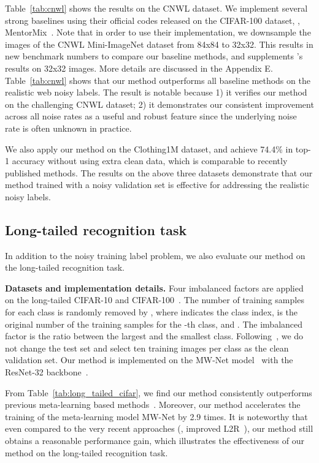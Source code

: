 \documentclass[final]{cvpr}
\begin{document}
Table~\ref{tab:cnwl} shows the results on the CNWL dataset. We implement several strong baselines using their official codes released on the CIFAR-100 dataset, \eg, 
MentorMix~\cite{jiang2020beyond}.
Note that in order to use their implementation, we downsample the images of the CNWL Mini-ImageNet dataset from 84x84 to 32x32. This results in new benchmark numbers to compare our baseline methods, and supplements \cite{jiang2020beyond}'s results on 32x32 images.
More details are discussed in the Appendix E.
Table~\ref{tab:cnwl} shows that our method outperforms all baseline methods on the realistic web noisy labels. The result is notable because 1) it verifies our method on the challenging CNWL dataset; 2) it demonstrates our consistent improvement across all noise rates as a useful and robust feature since the underlying noise rate is often unknown in practice.

We also apply our method on the Clothing1M dataset, and achieve 74.4\% in top-1 accuracy without using extra clean data, which is comparable to recently published methods. 
The results on the above three datasets demonstrate that our method trained with a noisy validation set is effective for addressing the realistic noisy labels.




\subsection{Long-tailed recognition task}

\label{sec:exp_longtail}

In addition to the noisy training label problem, we also evaluate our method on the long-tailed recognition task.

\textbf{Datasets and implementation details.} Four imbalanced factors  are applied on the long-tailed CIFAR-10 and CIFAR-100~\cite{cui2019class}. 
The number of training samples for each class is randomly removed by
, where  indicates the class index,  is the original number of the training samples for the -th class, and . The imbalanced factor is the ratio between the largest and the smallest class. Following~\cite{shu2019meta, Jamal_2020_CVPR}, we do not change the test set and select ten training images per class as the clean validation set. Our method is implemented on the MW-Net model~\cite{shu2019meta} with the ResNet-32 backbone~\cite{he2016deep}.


From Table~\ref{tab:long_tailed_cifar}, we find our method consistently outperforms previous meta-learning based methods~\cite{ren2018learning, shu2019meta, Jamal_2020_CVPR}. 
Moreover, our method accelerates the training of the meta-learning model MW-Net by 2.9 times.
It is noteworthy that even compared to the very recent approaches (\eg, improved L2R~\cite{Jamal_2020_CVPR}), our method still obtains a reasonable performance gain, which illustrates the effectiveness of our method on the long-tailed recognition task.
 
\end{document}
